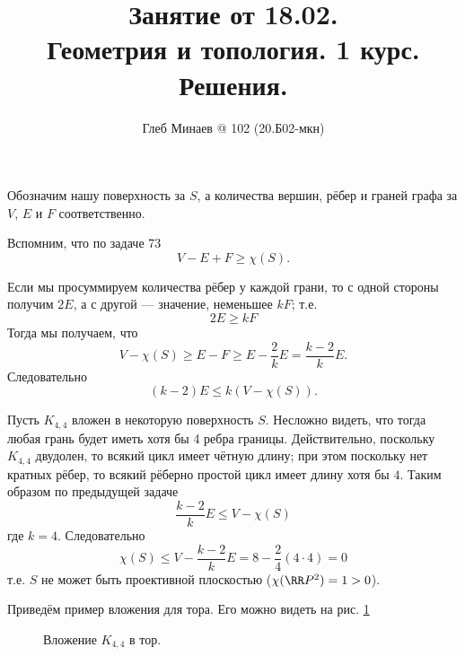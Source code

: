 \documentclass[12pt,a4paper]{article}
\title{Занятие от 18.02.\\Геометрия и топология. 1 курс.\\Решения.}
\author{Глеб Минаев @ 102 (20.Б02-мкн)}
\begin{document}
    \maketitle

    \begin{problem}{79}
        Обозначим нашу поверхность за $S$, а количества вершин, рёбер и граней графа за $V$, $E$ и $F$ соответственно.

        Вспомним, что по задаче 73
        \[V - E + F \geqslant \chi(S).\]

        Если мы просуммируем количества рёбер у каждой грани, то с одной стороны получим $2E$, а с другой --- значение, неменьшее $kF$; т.е.
        \[2E \geqslant kF\]
        Тогда мы получаем, что
        \[V - \chi(S) \geqslant E - F \geqslant E - \frac{2}{k} E = \frac{k-2}{k} E.\]
        Следовательно
        \[(k-2) E \leqslant k(V - \chi(S)).\]
    \end{problem}

    \begin{problem}{83}
        Пусть $K_{4,4}$ вложен в некоторую поверхность $S$. Несложно видеть, что тогда любая грань будет иметь хотя бы 4 ребра границы. Действительно, поскольку $K_{4,4}$ двудолен, то всякий цикл имеет чётную длину; при этом поскольку нет кратных рёбер, то всякий рёберно простой цикл имеет длину хотя бы $4$. Таким образом по предыдущей задаче
        \[\frac{k-2}{k} E \leqslant V - \chi(S)\]
        где $k = 4$. Следовательно
        \[\chi(S) \leqslant V - \frac{k-2}{k} E = 8 - \frac{2}{4} (4 \cdot 4) = 0\]
        т.е. $S$ не может быть проективной плоскостью ($\chi(\RR P^2) = 1 > 0$).

        Приведём пример вложения для тора. Его можно видеть на рис. \ref{K_4,4-in-torus}
        \begin{figure}[p]
            \Huge
            \centering
            \caption{Вложение $K_{4,4}$ в тор.}
            \label{K_4,4-in-torus}
        \end{figure}
    \end{problem}
\end{document}

